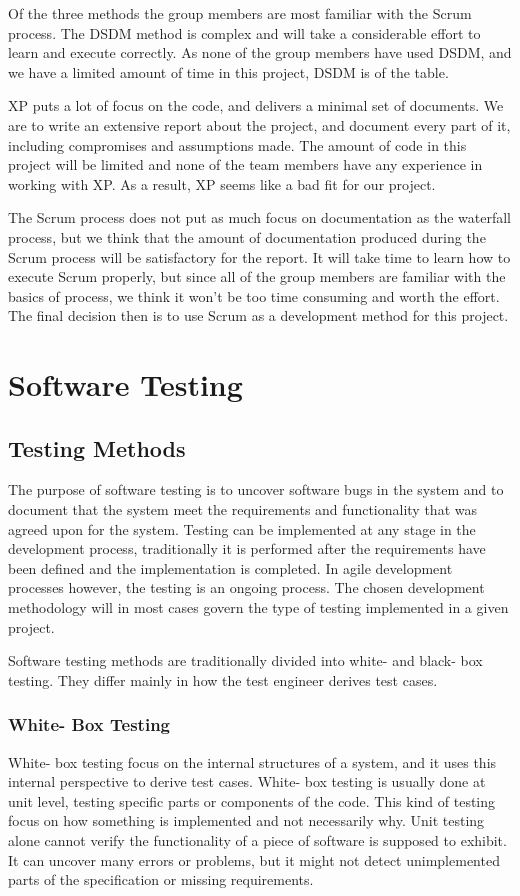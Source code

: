 Of the three methods the group members are most familiar with the Scrum process. The DSDM method is complex and will take a considerable effort to learn and execute correctly. As none of the group members have used DSDM, and we have a limited amount of time in this project, DSDM is of the table. 

XP puts a lot of focus on the code, and delivers a minimal set of documents. We are to write an extensive report about the project, and document every part of it, including compromises and assumptions made. The amount of code in this project will be limited and none of the team members have any experience in working with XP. As a result, XP seems like a bad fit for our project.

The Scrum process does not put as much focus on documentation as the waterfall process, but we think that the amount of documentation produced during the Scrum process will be satisfactory for the report. It will take time to learn how to execute Scrum properly, but since all of the group members are familiar with the basics of process, we think it won’t be too time consuming and worth the effort. The final decision then is to use Scrum as a development method for this project.

\section{Software Testing}

\subsection{Testing Methods}
The purpose of software testing is to uncover software bugs in the system and to document that the system meet the requirements and functionality that was agreed upon for the system. Testing can be implemented at any stage in the development process, traditionally it is performed after the requirements have been defined and the implementation is completed. In agile development processes however, the testing is an ongoing process. The chosen development methodology will in most cases govern the type of testing implemented in a given project.

Software testing methods are traditionally divided into white- and black- box testing. They differ mainly in how the test engineer derives test cases.

\subsubsection{White- Box Testing}
White- box testing focus on the internal structures of a system, and it uses this internal perspective to derive test cases. White- box testing is usually done at unit level, testing specific parts or components of the code. This kind of testing focus on how something is implemented and not necessarily why. Unit testing alone cannot verify the functionality of a piece of software is supposed to exhibit. It can uncover many errors or problems, but it might not detect unimplemented parts of the specification or missing requirements.

